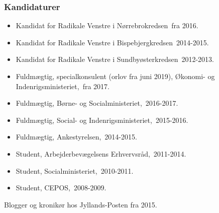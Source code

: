 \documentclass[11pt, a4paper]{awesome-cv}
\begin{document}
\begin{cvletter}
\subsubsection*{Kandidaturer}
\begin{itemize}
\item Kandidat for Radikale Venstre i Nørrebrokredsen fra 2016.
\item Kandidat for Radikale Venstre i Bispebjergkredsen 2014-2015.
\item Kandidat for Radikale Venstre i Sundbyøsterkredsen 2012-2013.
\end{itemize}
\begin{itemize}
\item Fuldmægtig, specialkonsulent (orlov fra juni 2019), Økonomi- og Indenrigsministeriet, fra 2017.
\item Fuldmægtig, Børne- og Socialministeriet, 2016-2017.
\item Fuldmægtig, Social- og Indenrigsministeriet, 2015-2016.
\item Fuldmægtig, Ankestyrelsen, 2014-2015.
\item Student, Arbejderbevægelsens Erhvervsråd, 2011-2014.
\item Student, Socialministeriet, 2010-2011.
\item Student, CEPOS, 2008-2009.
\end{itemize}
Blogger og kronikør hos Jyllands-Posten fra 2015. 

\end{cvletter}
\end{document}
